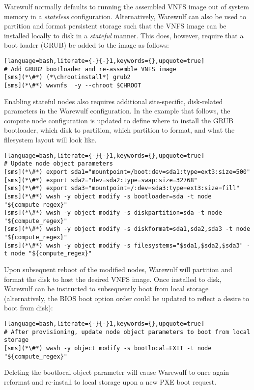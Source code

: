 Warewulf normally defaults to running the assembled VNFS image out of system
memory in a {\em stateless} configuration. Alternatively, Warewulf can also be
used to partition and format persistent storage such that the VNFS image can be
installed locally to disk in a {\em stateful} manner.  This does, however,
require that a boot loader (GRUB) be added to the image as follows:

\begin{lstlisting}[language=bash,literate={-}{-}1,keywords={},upquote=true]
# Add GRUB2 bootloader and re-assemble VNFS image
[sms](*\#*) (*\chrootinstall*) grub2
[sms](*\#*) wwvnfs  -y --chroot $CHROOT
\end{lstlisting}

\noindent Enabling stateful nodes also requires additional site-specific, disk-related
parameters in the Warewulf configuration. In the example that follows, the
compute node configuration is updated to define where to install the GRUB
bootloader, which disk to partition, which partition to format, and what the
filesystem layout will look like.

\begin{lstlisting}[language=bash,literate={-}{-}1,keywords={},upquote=true]
# Update node object parameters
[sms](*\#*) export sda1="mountpoint=/boot:dev=sda1:type=ext3:size=500"
[sms](*\#*) export sda2="dev=sda2:type=swap:size=32768"
[sms](*\#*) export sda3="mountpoint=/:dev=sda3:type=ext3:size=fill"
[sms](*\#*) wwsh -y object modify -s bootloader=sda -t node "${compute_regex}" 
[sms](*\#*) wwsh -y object modify -s diskpartition=sda -t node "${compute_regex}" 
[sms](*\#*) wwsh -y object modify -s diskformat=sda1,sda2,sda3 -t node "${compute_regex}" 
[sms](*\#*) wwsh -y object modify -s filesystems="$sda1,$sda2,$sda3" -t node "${compute_regex}" 
\end{lstlisting}

\noindent Upon subsequent reboot of the modified nodes, Warewulf will partition
and format the disk to host the desired VNFS image.  Once installed to disk,
Warewulf can be instructed to subsequently boot from local storage
(alternatively, the BIOS boot option order could be updated to reflect a desire
to boot from disk):

\begin{lstlisting}[language=bash,literate={-}{-}1,keywords={},upquote=true]
# After provisioning, update node object parameters to boot from local storage
[sms](*\#*) wwsh -y object modify -s bootlocal=EXIT -t node "${compute_regex}"
\end{lstlisting}


\noindent Deleting the bootlocal object parameter will cause Warewulf to once
again reformat and re-install to local storage upon a new PXE boot request.
